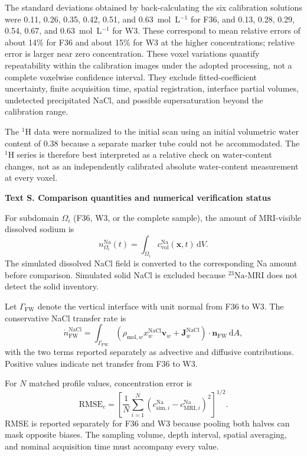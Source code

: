 \documentclass[draft,wrr]{agutexSI2019}
\newcounter{sitext}
\renewcommand{\thesitext}{S\arabic{sitext}}
\newcommand{\sitext}[1]{%
  \refstepcounter{sitext}%
  \par\medskip\noindent\textbf{Text \thesitext. #1}\par\medskip}
\newcommand{\NaIso}{\(^{23}\mathrm{Na}\)}
\newcommand{\HIso}{\(^{1}\mathrm{H}\)}
\begin{document}
\begin{article}
The standard deviations obtained by back-calculating the six calibration
solutions were 0.11, 0.26, 0.35, 0.42, 0.51, and
0.63~mol~L$^{-1}$ for F36, and 0.13, 0.28, 0.29, 0.54, 0.67, and
0.63~mol~L$^{-1}$ for W3. These correspond to mean relative errors of about
14\% for F36 and about 15\% for W3 at the higher concentrations; relative error
is larger near zero concentration. These voxel variations quantify repeatability
within the calibration images under the adopted processing, not a complete
voxelwise confidence interval. They exclude fitted-coefficient uncertainty,
finite acquisition time, spatial registration, interface partial volumes,
undetected precipitated NaCl, and possible supersaturation beyond the
calibration range.

The \HIso{} data were normalized to the initial scan using an initial
volumetric water content of 0.38 because a separate marker tube could not be
accommodated. The \HIso{} series is therefore best interpreted as a relative
check on water-content changes, not as an independently calibrated absolute
water-content measurement at every voxel.

\sitext{Comparison quantities and numerical verification status}
\label{app:verification}

For subdomain $\Omega_i$ (F36, W3, or the complete sample), the amount of
MRI-visible dissolved sodium is
\begin{equation}
n_{\Omega_i}^{\mathrm{Na}}(t)=
\int_{\Omega_i}c_{\mathrm{vol}}^{\mathrm{Na}}(\boldsymbol{x},t)
\,\mathrm{d}V.
\label{eq:si-integrated-na}
\end{equation}
The simulated dissolved NaCl field is converted to the corresponding Na amount
before comparison. Simulated solid NaCl is excluded because \NaIso-MRI does not
detect the solid inventory.

Let $\Gamma_{\mathrm{FW}}$ denote the vertical interface with unit normal from
F36 to W3. The conservative NaCl transfer rate is
\begin{equation}
\dot n_{\mathrm{FW}}^{\mathrm{NaCl}}=
\int_{\Gamma_{\mathrm{FW}}}
\left(
\rho_{\mathrm{mol},w}x_w^{\mathrm{NaCl}}\boldsymbol{v}_w
+\boldsymbol{J}_w^{\mathrm{NaCl}}
\right)\!\cdot\boldsymbol{n}_{\mathrm{FW}}\,\mathrm{d}A,
\label{eq:si-interface-flux}
\end{equation}
with the two terms reported separately as advective and diffusive contributions.
Positive values indicate net transfer from F36 to W3.

For $N$ matched profile values, concentration error is
\begin{equation}
\mathrm{RMSE}_c=
\left[
\frac{1}{N}\sum_{i=1}^{N}
\left(c_{\mathrm{sim},i}^{\mathrm{Na}}-
c_{\mathrm{MRI},i}^{\mathrm{Na}}\right)^2
\right]^{1/2}.
\label{eq:si-rmse}
\end{equation}
RMSE is reported separately for F36 and W3 because pooling both halves can mask
opposite biases. The sampling volume, depth interval, spatial averaging, and
nominal acquisition time must accompany every value.


\end{article}
\end{document}
